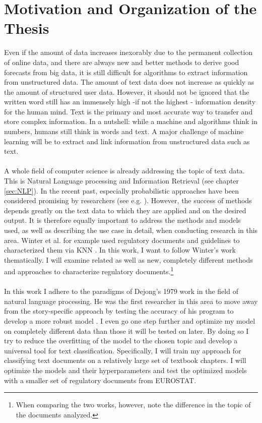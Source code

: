 \documentclass[11pt,a4paper]{article}
\author{Sebastian Knigge}
\begin{document}
	
\section{Motivation and Organization of the Thesis}
	
Even if the amount of data increases inexorably due to the permanent collection of online data, and there are always new and better methods to derive good forecasts from big data, it is still difficult for algorithms to extract information from unstructured data. The amount of text data does not increase as quickly as the amount of structured user data. However, it should not be ignored that the written word still has an immensely high -if not the highest - information density for the human mind. Text is the primary and most accurate way to transfer and store complex information. In a nutshell: while a machine and algorithms think in numbers, humans still think in words and text. A major challenge of machine learning will be to extract and link information from unstructured data such as text.\\
\ \\
A whole field of computer science is already addressing the topic of text data. This is Natural Language processing and Information Retrieval (see chapter \ref{sec:NLP}). In the recent past, especially probabilistic approaches have been considered promising by researchers (see e.g. \cite{Manning1999}). However, the success of methods depends greatly on the text data to which they are applied and on the desired output. It is therefore equally important to address the methods and models used, as well as describing the use case in detail, when conducting research in this area. Winter et al. for example used regulatory documents and guidelines to characterized them via KNN \cite{Winter2017}. In this work, I want to follow Winter's work thematically. I will examine related as well as new, completely different methods and approaches to characterize regulatory documents.\footnote{When comparing the two works, however, note the difference in the topic of the documents analyzed.}\\
\ \\
In this work I adhere to the paradigms of Dejong's 1979 work in the field of natural language processing. He was the first researcher in this area to move away from the story-specific approach by testing the accuracy of his program to develop a more robust model \cite{DeJong1979}. I even go one step further and optimize my model on completely different data than those it will be tested on later. By doing so I try to reduce the overfitting of the model to the chosen topic and develop a universal tool for text classification. Specifically, I will train my approach for classifying text documents on a relatively large set of textbook chapters. I will optimize the models and their hyperparameters and test the optimized models with a smaller set of regulatory documents from EUROSTAT.
	
\end{document}
